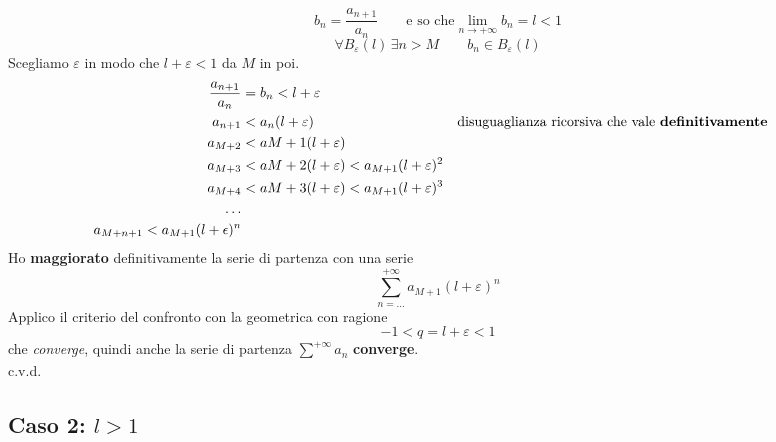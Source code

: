 \documentclass[../dimostrazioni]{subfiles}
\begin{document}
                \[b_n = \frac{a_{n+1}}{a_n} \qquad \text{e so che} \lim_{n \to +\infty}b_n = l < 1 \] 
                \[\forall B_\varepsilon (l) \, \exists n > M \qquad b_n \in B_\varepsilon (l) \]
                Scegliamo \(\varepsilon\) in modo che \(l + \varepsilon < 1 \) da \(M\) in poi.
                \begin{align*}
                    \frac{a_{n+1}}{a_n} &= b_n < l + \varepsilon \\
                    a_{n+1} &< a_n(l + \varepsilon) && \text{disuguaglianza ricorsiva che vale \textbf{definitivamente}} \\
                    a_{M+2} &< a{M+1} (l + \varepsilon) \\
                    a_{M+3} &< a{M+2} (l + \varepsilon) < a_{M+1}(l + \varepsilon)^{2}\\
                    a_{M+4} &< a{M+3} (l + \varepsilon) < a_{M+1}(l + \varepsilon)^{3} \\
                    \qquad \dots \\
                    a_{M+n+1}< a_{M+1}(l + \epsilon)^{n}
                \end{align*}
                Ho \textbf{maggiorato} definitivamente la serie di partenza con una serie
                \[ \sum_{n=\dots}^{+\infty} a_{M+1}(l + \varepsilon)^{n}\] 
                Applico il criterio del confronto con la geometrica con ragione
                \[-1 < q = l + \varepsilon < 1 \]
                che \emph{converge}, quindi anche la serie di partenza \(\sum_{}^{+\infty} a_n \) \textbf{converge}. \\
                c.v.d. 

            \subsection*{Caso 2: \(l > 1\)}




                        
\end{document}
